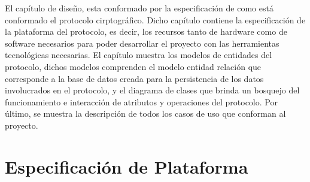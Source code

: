 
El capítulo de diseño, esta conformado por la especificación de como está conformado el protocolo cirptográfico. Dicho capítulo contiene la especificación de la plataforma del protocolo, es decir, los recursos tanto de hardware como de software necesarios para poder desarrollar el proyecto con las herramientas tecnológicas necesarias. El capítulo muestra los modelos de entidades del protocolo, dichos modelos comprenden el modelo entidad relación que corresponde a la base de datos creada para la persistencia de los datos involucrados en el protocolo, y el diagrama de clases que brinda un bosquejo del funcionamiento e interacción de atributos y operaciones del protocolo. Por último, se muestra la descripción de todos los casos de uso que conforman al proyecto. 





\section{Especificación de Plataforma}




